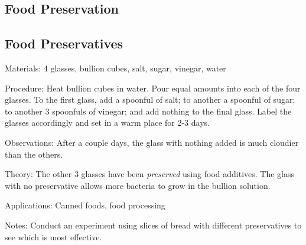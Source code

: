 \begin{multicols}{2}

\section*{Food Preservation} 


\subsection{Food Preservatives} %


\begin{description*}
\item[Materials:]{4 glasses, bullion cubes, salt, sugar, vinegar, water}
\item[Procedure:]{Heat bullion cubes in water. Pour equal amounts into each of the four glasses. To the first glass, add a spoonful of salt; to another a spoonful of sugar; to another 3 spoonfuls of vinegar; and add nothing to the final glass. Label the glasses accordingly and set in a warm place for 2-3 days.}
\item[Observations:]{After a couple days, the glass with nothing added is much cloudier than the others.}
\item[Theory:]{The other 3 glasses have been \emph{preserved} using food additives. The glass with no preservative allows more bacteria to grow in the bullion solution.}
\item[Applications:]{Canned foods, food processing}
\item[Notes:]{Conduct an experiment using slices of bread with different preservatives to see which is most effective.}
\end{description*}



\end{multicols}

\pagebreak